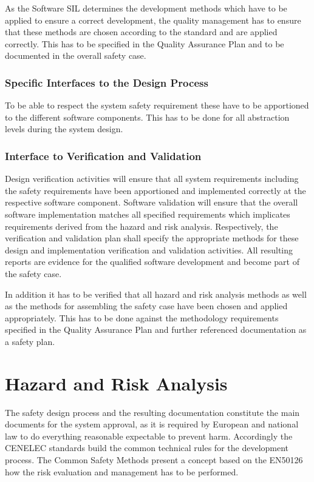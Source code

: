\documentclass{template/openetcs_report}
\begin{document}
As the Software SIL determines the development methods which have to be applied to ensure a correct development, the quality management has to ensure that these methods are chosen according to the standard and are applied correctly. This has to be specified in the Quality Assurance Plan and to be documented in the overall safety case. 

\subsection{Specific Interfaces to the Design Process}

To be able to respect the system safety requirement these have to be apportioned to the different software components. This has to be done for all abstraction levels during the system design. 

\subsection{Interface to Verification and Validation}

Design verification activities will ensure that all system requirements including the safety requirements have been apportioned and implemented correctly at the respective software component. Software validation will ensure that the overall software implementation matches all specified requirements which implicates requirements derived from the hazard and risk analysis. Respectively, the verification and validation plan shall specify the appropriate methods for these design and implementation verification and validation activities. All resulting reports are evidence for the qualified software development and become part of the safety case.

In addition it has to be verified that all hazard and risk analysis methods as well as the methods for assembling the safety case have been chosen and applied appropriately. This has to be done against the methodology requirements specified in the Quality Assurance Plan and further referenced documentation as a safety plan.

\chapter{Hazard and Risk Analysis}
\label{sec:hazardandrisk}
The safety design process and the resulting documentation constitute the main documents for the system approval, as it is required by European and national law to do everything reasonable expectable to prevent harm. Accordingly the CENELEC standards build the common technical rules for the development process. The Common Safety Methods present a concept based on the EN50126 how the risk evaluation and management has to be performed. 
\end{document}
